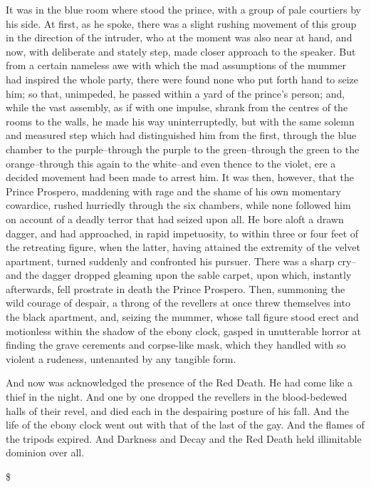 \documentclass[smalldemyvopaper,14pt,twoside,onecolumn,openright,extrafontsizes,showtrims]{memoir}
\newlength\drop
\newcommand*{\sceneHeadline}[1][]{%
\begin{center} {\Huge\myBorder \$}\end{center}
}
\begin{document}
It was in the blue room where stood the prince, with a group of pale courtiers by his side. At first, as he spoke, there was a slight rushing movement of this group in the direction of the intruder, who at the moment was also near at hand, and now, with deliberate and stately step, made closer approach to the speaker. But from a certain nameless awe with which the mad assumptions of the mummer had inspired the whole party, there were found none who put forth hand to seize him; so that, unimpeded, he passed within a yard of the prince's person; and, while the vast assembly, as if with one impulse, shrank from the centres of the rooms to the walls, he made his way uninterruptedly, but with the same solemn and measured step which had distinguished him from the first, through the blue chamber to the purple--through the purple to the green--through the green to the orange--through this again to the white--and even thence to the violet, ere a decided movement had been made to arrest him. It was then, however, that the Prince Prospero, maddening with rage and the shame of his own momentary cowardice, rushed hurriedly through the six chambers, while none followed him on account of a deadly terror that had seized upon all. He bore aloft a drawn dagger, and had approached, in rapid impetuosity, to within three or four feet of the retreating figure, when the latter, having attained the extremity of the velvet apartment, turned suddenly and confronted his pursuer. There was a sharp cry--and the dagger dropped gleaming upon the sable carpet, upon which, instantly afterwards, fell prostrate in death the Prince Prospero. Then, summoning the wild courage of despair, a throng of the revellers at once threw themselves into the black apartment, and, seizing the mummer, whose tall figure stood erect and motionless within the shadow of the ebony clock, gasped in unutterable horror at finding the grave cerements and corpse-like mask, which they handled with so violent a rudeness, untenanted by any tangible form.

And now was acknowledged the presence of the Red Death. He had come like a thief in the night. And one by one dropped the revellers in the blood-bedewed halls of their revel, and died each in the despairing posture of his fall. And the life of the ebony clock went out with that of the last of the gay. And the flames of the tripods expired. And Darkness and Decay and the Red Death held illimitable dominion over all.


\sceneHeadline{} 
\end{document}
